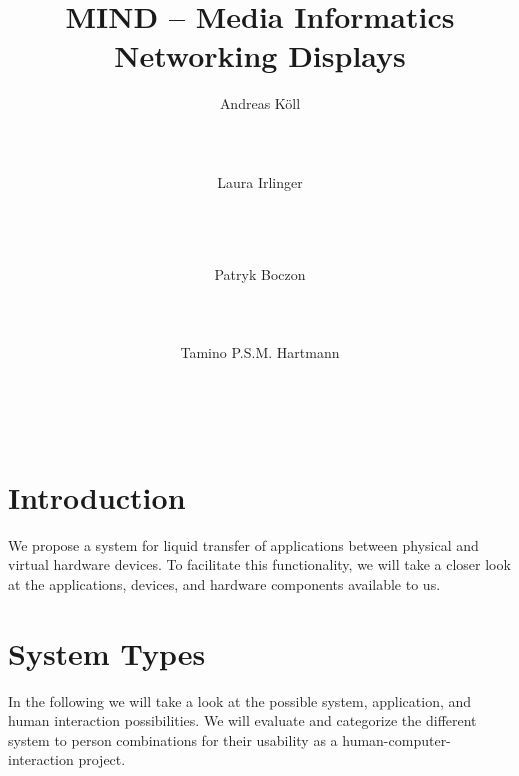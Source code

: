 \documentclass{acm_proc_article-sp}
\begin{document}
\title{MIND – Media Informatics Networking Displays}

\author{
\alignauthor
Andreas Köll\\
       \\
       \\
       \\
\alignauthor
Laura Irlinger\\
       \\
       \\
       \\
\and
\alignauthor
Patryk Boczon\\
       \\
       \\
       \\
\alignauthor
Tamino P.S.M. Hartmann\\
       \\
       \\
       \\
}

\maketitle

\section{Introduction}

We propose a system for liquid transfer of applications between physical and virtual hardware devices.
To facilitate this functionality, we will take a closer look at the applications, devices, and hardware components available to us.

\section{System Types}

In the following we will take a look at the possible system, application, and human interaction possibilities.
We will evaluate and categorize the different system to person combinations for their usability as a human-computer-interaction project.
\end{document}
